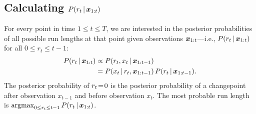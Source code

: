 \documentclass[10pt,english,oneside]{article}
\begin{document}

\subsection{Calculating $P(r_t \,|\, \boldsymbol{x}_{1:t})$}

For every point in time $1 \leq t \leq T$, we are interested in the
posterior probabilities of all possible run lengths at that point
given observations $\boldsymbol{x}_{1:t}$---i.e., $P(r_t \,|\, \boldsymbol{x}_{1:t})$ for all
$0 \leq r_t \leq t-1$:
\begin{align}
  P(r_t \,|\, \boldsymbol{x}_{1:t}) &\propto P(r_t, x_t \,|\, \boldsymbol{x}_{1:t-1})\\
  &= P(x_t \,|\, r_t, \boldsymbol{x}_{1:t-1})\,P(r_t \,|\, \boldsymbol{x}_{1:t-1}).
\end{align}
The posterior probability of $r_t \!=\! 0$ is the posterior probability
of a changepoint after observation $x_{t-1}$ and before observation
$x_t$. The most probable run length is $\argmax_{0 \leq r_t \leq t-1}
P(r_t \g \bx_{1:t})$.
\end{document}
